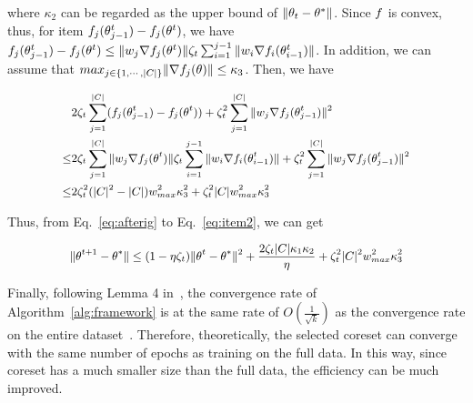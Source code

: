 \noindent where $\kappa_2$ can be regarded as the upper bound of $\Vert \theta_t - \theta^{*} \Vert$.
Since $f$ is convex, thus, for item $f_{j}(\theta_{j-1}^{t}) 
- f_{j}(\theta^{t})$, we have $f_{j}(\theta_{j-1}^{t}) 
- f_{j}(\theta^{t}) \leq \Vert w_j \nabla f_{j}(\theta^{t}) \Vert \zeta_t \sum_{i=1}^{j - 1} \Vert w_i \nabla f_{i}(\theta_{i-1}^{t}) \Vert$. In addition, we can assume that $max_{j \in \{ 1, \cdots, \vert C \vert\}} \Vert \nabla f_j(\theta) \Vert \le \kappa_3$. 
Then, we have

\vspace{-1em}
\begin{equation}
	\label{eq:item2}
	\small
	\begin{aligned}
		& 2 \zeta_{t} \sum_{j=1}^{\vert C \vert} (f_{j}(\theta_{j-1}^{t}) 
		- f_{j}(\theta^{t})) + \zeta_{t}^{2} \sum_{j=1}^{\vert C \vert} \Vert w_{j} \nabla f_j (\theta_{j-1}^t) \Vert^{2} \\
		\le & 2 \zeta_{t} \sum_{j=1}^{\vert C \vert} \Vert w_j \nabla f_{j}(\theta^{t}) \Vert \zeta_t \sum_{i=1}^{j - 1} \Vert w_i \nabla f_{i}(\theta_{i-1}^{t}) \Vert + \zeta_{t}^{2} \sum_{j=1}^{\vert C \vert} \Vert w_{j} \nabla f_j (\theta_{j-1}^t) \Vert^{2}\\
		\le & 2 \zeta_t^2 (\vert C \vert^2 - \vert C \vert) w_{max}^2 \kappa_3^2 + \zeta_t^2 \vert C \vert w_{max}^2 \kappa_3^2
	\end{aligned}
\end{equation}

Thus, from Eq.~\ref{eq:afterig} to Eq.~\ref{eq:item2}, we can get

\vspace{-0.5em}
\begin{equation}
	\small
	\begin{aligned}
		\Vert \theta^{t+1} - \theta^{*} \Vert
		\le  (1 - \eta \zeta_t)\Vert \theta^{t} - \theta^{*} \Vert^{2} + \frac{2 \zeta_{t} \vert C \vert \kappa_1 \kappa_2 }{\eta}  + \zeta_t^2 \vert C \vert^2 w_{max}^2 \kappa_3^2 
	\end{aligned}
\end{equation}

Finally, following Lemma 4 in~\cite{chung1954stochastic}, the convergence rate of Algorithm~\ref{alg:framework} is at the same rate of $O(\frac{1}{\sqrt{k}})$ as the  convergence rate on the entire dataset~\cite{nedic2001convergence}. Therefore, theoretically, the selected coreset can converge with the same number of epochs as training on the full data. In this way, since  coreset has a much smaller size than the full data, the efficiency can be much improved.